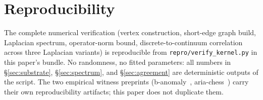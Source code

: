 \documentclass[11pt]{article}
\begin{document}











\section*{Reproducibility}
The complete numerical verification (vertex construction,
short-edge graph build, Laplacian spectrum, operator-norm bound,
discrete-to-continuum correlation across three Laplacian variants)
is reproducible from \texttt{repro/verify\_kernel.py} in this
paper's bundle. No randomness, no fitted parameters: all numbers
in \S\ref{sec:substrate}, \S\ref{sec:spectrum}, and
\S\ref{sec:agreement} are deterministic outputs of the script.
The two empirical witness preprints
(b-anomaly~\citep{SmartBAnomaly2026},
aria-chess~\citep{SmartAriaChess2026}) carry their own
reproducibility artifacts; this paper does not duplicate them.



\end{document}
